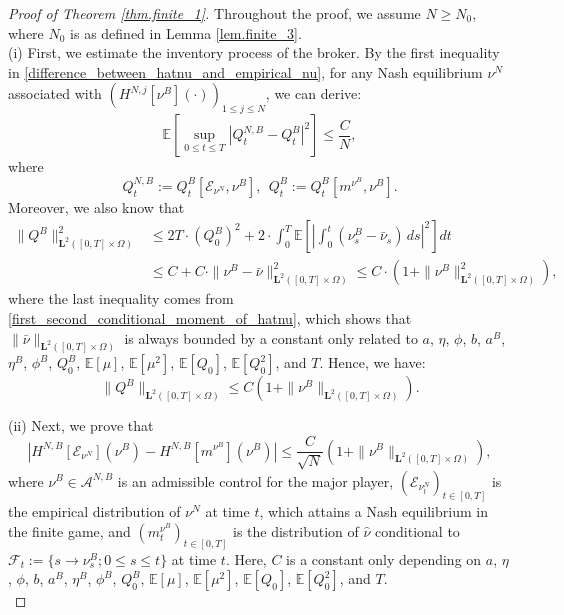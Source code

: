 \documentclass[10pt,a4paper]{amsart}
\begin{document}
\begin{proof}[Proof of Theorem \ref{thm.finite_1}]

    Throughout the proof, we assume $N \geq N_0$, where $N_0$ is as defined in Lemma \ref{lem.finite_3}. \\

    (i) First, we estimate the inventory process of the broker. By the first inequality in \eqref{difference_between_hatnu_and_empirical_nu}, for any Nash equilibrium $\nu^N$ associated with $(H^{N,j}[\nu^B](\cdot))_{1 \leq j \leq N}$, we can derive:
    \begin{equation}\label{difference_between_QNB_and_QB}
        \mathbb{E} \left[ \underset{0 \leq t \leq T}{\sup} \left| Q_t^{N,B} - Q^B_t \right|^2 \right] \leq \frac{C}{N},
    \end{equation}
    where
    $$
    Q_t^{N,B} := Q^B_t[\mathcal{E}_{\nu^N}, \nu^B],~~ Q_t^{B} := Q^B_t[m^{\nu^B}, \nu^B].
    $$
    Moreover, we also know that 
    \begin{align*}
        \|Q^B\|^2_{\mathbf{L}^2 ([0,T] \times \Omega)} &\leq 2T \cdot (Q_0^B)^2 + 2 \cdot \int_0^T \mathbb{E} \left[ \left| \int_0^t (\nu_s^B - \bar{\nu}_s) \, ds \right|^2 \right] dt \\
        &\leq C + C \cdot \|\nu^B - \bar{\nu}\|^2_{\mathbf{L}^2 ([0,T] \times \Omega)} \leq C \cdot \left( 1 + \|\nu^B\|^2_{\mathbf{L}^2 ([0,T] \times \Omega)} \right),
    \end{align*}
    where the last inequality comes from \eqref{first_second_conditional_moment_of_hatnu}, which shows that $\|\bar{\nu}\|_{\mathbf{L}^2 ([0,T] \times \Omega)}$ is always bounded by a constant only related to $a$, $\eta$, $\phi$, $b$, $a^B$, $\eta^B$, $\phi^B$, $Q_0^B$, $\mathbb{E}[\mu]$, $\mathbb{E}[\mu^2]$, $\mathbb{E}[Q_0]$, $\mathbb{E}[Q_0^2]$, and $T$. Hence, we have:
    \begin{equation}\label{QB_estimate}
        \|Q^B\|_{\mathbf{L}^2 ([0,T] \times \Omega)} \leq C \left( 1 + \|\nu^B\|_{\mathbf{L}^2 ([0,T] \times \Omega)} \right).
    \end{equation}

    (ii) Next, we prove that 
    \begin{equation}\label{HNB_estimate}
        \left| H^{N,B}\left[\mathcal{E}_{\nu^N}\right]\left(\nu^B\right) - H^{N,B}\left[m^{\nu^B}\right]\left(\nu^B\right) \right| \leq \frac{C}{\sqrt{N}} \left( 1 + \|\nu^B\|_{\mathbf{L}^2 ([0,T] \times \Omega)} \right),
    \end{equation}
    where $\nu^B \in \mathcal{A}^{N,B}$ is an admissible control for the major player, 
    $(\mathcal{E}_{\nu_t^N})_{t \in [0,T]}$ is the empirical distribution of $\nu^N$ at time $t$, which attains a Nash equilibrium in the finite game, 
    and $(m^{\nu^B}_t)_{t \in [0,T]}$ is the distribution of $\hat{\nu}$ conditional to $\mathcal{F}_t := \{ s \to \nu^B_s ; 0 \leq s \leq t \}$ at time $t$.    
    Here, $C$ is a constant only depending on $a$, $\eta$, $\phi$, $b$, $a^B$, $\eta^B$, $\phi^B$, $Q_0^B$, $\mathbb{E}[\mu]$, $\mathbb{E}[\mu^2]$, $\mathbb{E}[Q_0]$, $\mathbb{E}[Q_0^2]$, and $T$. \\


\end{proof}
\end{document}
